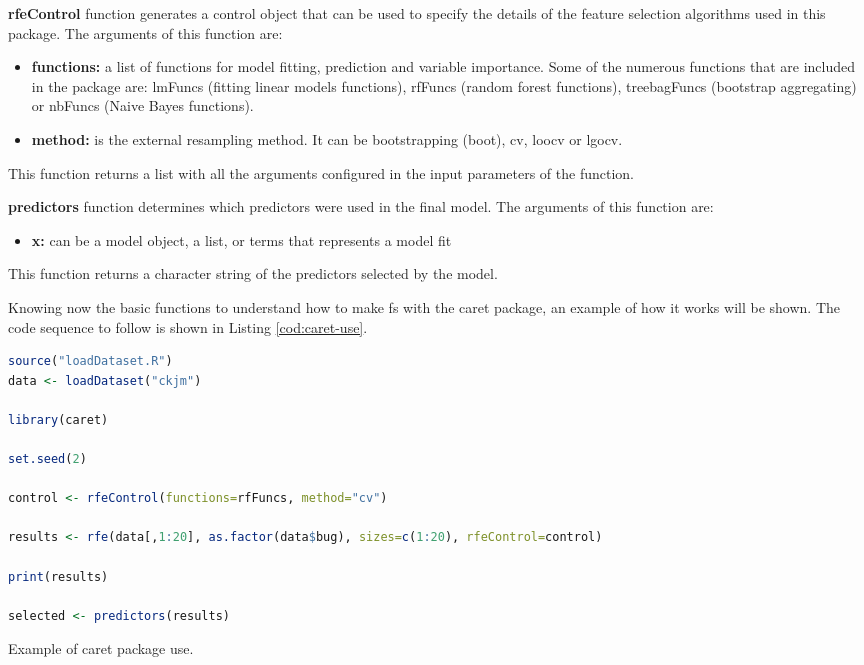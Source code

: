 \textbf{rfeControl} function generates a control object that can be used to specify the details of the feature selection algorithms used in this package. The arguments of this function are:

\begin{itemize}
    \item \textbf{functions:} a list of functions for model fitting, prediction and variable importance. Some of the numerous functions that are included in the package are: lmFuncs (fitting linear models functions), rfFuncs (random forest functions), treebagFuncs (bootstrap aggregating) or nbFuncs (Naive Bayes functions).
    
    \item \textbf{method:} is the external resampling method. It can be bootstrapping (boot), \acrfull{cv}, \acrfull{loocv} or \acrfull{lgocv}.
\end{itemize}

This function returns a list with all the arguments configured in the input parameters of the function.

\textbf{predictors} function determines which predictors were used in the final model. The arguments of this function are:

\begin{itemize}
    \item \textbf{x:} can be a model object, a list, or terms that represents a model fit
\end{itemize}

This function returns a character string of the predictors selected by the model.

Knowing now the basic functions to understand how to make \acrshort{fs} with the caret package, an example of how it works will be shown. The code sequence to follow is shown in Listing \ref{cod:caret-use}.

\begin{codefloat}[H]
\begin{lstlisting}[language=R, style=Ccolor]
source("loadDataset.R")
data <- loadDataset("ckjm")

library(caret)

set.seed(2)

control <- rfeControl(functions=rfFuncs, method="cv")

results <- rfe(data[,1:20], as.factor(data$bug), sizes=c(1:20), rfeControl=control)

print(results)

selected <- predictors(results)
\end{lstlisting}
\caption{Example of caret package use.}
\label{cod:caret-use}
\end{codefloat}

